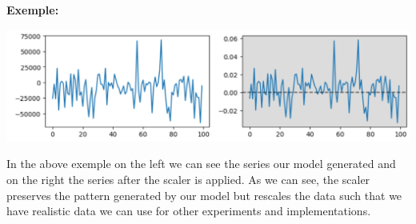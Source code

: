 \documentclass{article}
\begin{document}
    \textbf{Exemple:}
    \begin{center}
        \includegraphics[scale=0.6]{imgs/riccardo/EX_03.png}
    \end{center}
    In the above exemple on the left we can see the series our model generated and on the right the series after the scaler is applied. As we can see,  
    the scaler preserves the pattern generated by our model but rescales the data such that we have realistic data we can use for other experiments and implementations.
\end{document}
